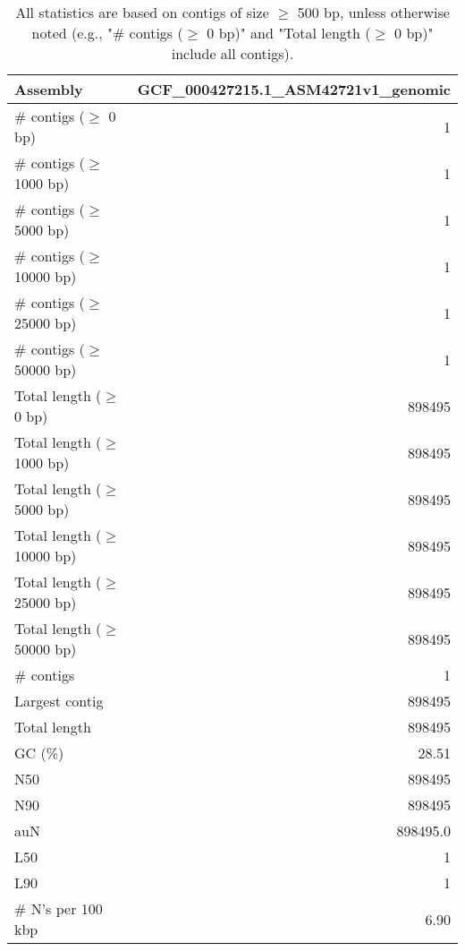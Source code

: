 \documentclass[12pt,a4paper]{article}
\begin{document}
\begin{table}[ht]
\begin{center}
\caption{All statistics are based on contigs of size $\geq$ 500 bp, unless otherwise noted (e.g., "\# contigs ($\geq$ 0 bp)" and "Total length ($\geq$ 0 bp)" include all contigs).}
\begin{tabular}{|l*{1}{|r}|}
\hline
Assembly & GCF\_000427215.1\_ASM42721v1\_genomic \\ \hline
\# contigs ($\geq$ 0 bp) & 1 \\ \hline
\# contigs ($\geq$ 1000 bp) & 1 \\ \hline
\# contigs ($\geq$ 5000 bp) & 1 \\ \hline
\# contigs ($\geq$ 10000 bp) & 1 \\ \hline
\# contigs ($\geq$ 25000 bp) & 1 \\ \hline
\# contigs ($\geq$ 50000 bp) & 1 \\ \hline
Total length ($\geq$ 0 bp) & 898495 \\ \hline
Total length ($\geq$ 1000 bp) & 898495 \\ \hline
Total length ($\geq$ 5000 bp) & 898495 \\ \hline
Total length ($\geq$ 10000 bp) & 898495 \\ \hline
Total length ($\geq$ 25000 bp) & 898495 \\ \hline
Total length ($\geq$ 50000 bp) & 898495 \\ \hline
\# contigs & 1 \\ \hline
Largest contig & 898495 \\ \hline
Total length & 898495 \\ \hline
GC (\%) & 28.51 \\ \hline
N50 & 898495 \\ \hline
N90 & 898495 \\ \hline
auN & 898495.0 \\ \hline
L50 & 1 \\ \hline
L90 & 1 \\ \hline
\# N's per 100 kbp & 6.90 \\ \hline
\end{tabular}
\end{center}
\end{table}
\end{document}
